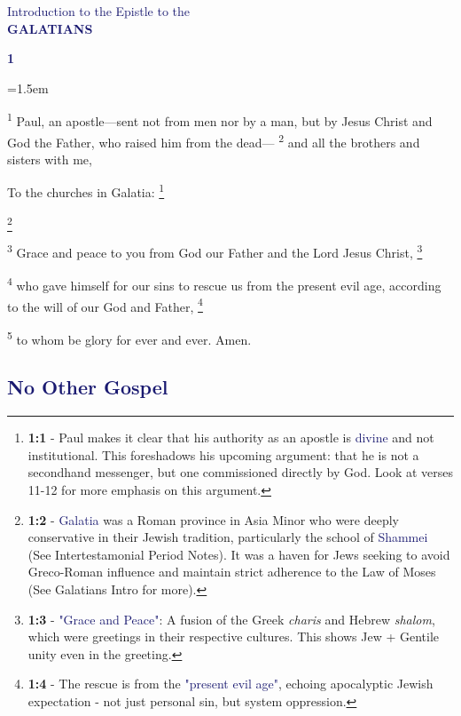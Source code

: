 \documentclass[12pt,twoside]{article}
\newcommand{\vs}[1]{\textsuperscript{#1}}
\newcommand{\vnote}[2]{%
  \begingroup
  \renewcommand\thefootnote{}%
  \footnote{\scriptsize \textbf{}#2}%
  \addtocounter{footnote}{-1}%
  \endgroup
}
\newcommand{\chapterWithIndent}[2]{%
  \noindent
  \begin{minipage}[t]{1cm}
    \vspace{-0.4\baselineskip}
    {\textcolor{MidnightBlue}{\fontsize{40pt}{48pt}\selectfont \textbf{#1}}}
  \end{minipage}%
  \hspace{0.3cm}%
  \begin{minipage}[t]{\dimexpr\linewidth - 1.5cm - 0.3cm\relax}
    \hangindent=1.5em
    \hangafter=3
    #2
    \vspace{0.05cm}
  \end{minipage}
}
\begin{document}
\begin{center}
{\textcolor{MidnightBlue}{Introduction to the Epistle to the}}\\
\vspace{0.5cm}
{\textcolor{MidnightBlue}{\fontsize{40pt}{48pt}\selectfont \textbf{GALATIANS}}}\\
\vspace{2cm}
\vspace{-1cm}
\end{center}
\thispagestyle{fancy}

\newpage



\chapterWithIndent{1}{
    \vs{1} Paul, an apostle---sent not from men nor by a man, but by Jesus Christ and God the Father, who raised him from the dead---
    \vs{2} and all the brothers and sisters with me,\vspace{0.3cm}
}

To the churches in Galatia:\vspace{0.3cm}\vnote{1}{\textbf{1:1} - Paul makes it clear that his authority as an apostle is \textcolor{MidnightBlue}{divine} and not institutional. This foreshadows his upcoming argument: that he is not a secondhand messenger, but one commissioned directly by God. Look at verses 11-12 for more emphasis on this argument.}
\vnote{2}{\textbf{1:2} - \textcolor{MidnightBlue}{Galatia} was a Roman province in Asia Minor who were deeply conservative in their Jewish tradition, particularly the school of \textcolor{MidnightBlue}{Shammei} (See Intertestamonial Period Notes). It was a haven for Jews seeking to avoid Greco-Roman influence and maintain strict adherence to the Law of Moses (See Galatians Intro for more).}

\vs{3} Grace and peace to you from God our Father and the Lord Jesus Christ,\vnote{3}{\textbf{1:3} - \textcolor{MidnightBlue}{"Grace and Peace"}: A fusion of the Greek \textit{charis} and Hebrew \textit{shalom}, which were greetings in their respective cultures. This shows Jew + Gentile unity even in the greeting.}
\vs{4} who gave himself for our sins to rescue us from the present evil age, according to the will of our God and Father,\vnote{4}{\textbf{1:4} - The rescue is from the \textcolor{MidnightBlue}{"present evil age"}, echoing apocalyptic Jewish expectation - not just personal sin, but system oppression.}
\vs{5} to whom be glory for ever and ever. Amen.

\subsection*{\textcolor{MidnightBlue}{\textbf{No Other Gospel}}}
\end{document}

